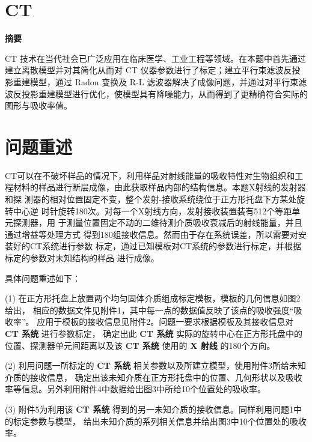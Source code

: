 \documentclass[12pt]{ctexart}
\begin{document}
	\section*{CT}
	
	\begin{center}
		\Large\textbf{摘要}
	\end{center}
	
	CT 技术在当代社会已广泛应用在临床医学、工业工程等领域。在本题中首先通过建立离散模型并对其简化从而对 CT 仪器参数进行了标定；建立平行束滤波反投影重建模型，通过 Radon 变换及 R-L 滤波器解决了成像问题，并通过对平行束滤波反投影重建模型进行优化，使模型具有降噪能力，从而得到了更精确符合实际的图形与吸收率值。
	
	
	
	\newpage
	
	\section{问题重述}
	
	CT可以在不破坏样品的情况下，利用样品对射线能量的吸收特性对生物组织和工
	程材料的样品进行断层成像，由此获取样品内部的结构信息。本题X射线的发射器和探
	测器的相对位置固定不变，整个发射-接收系统绕位于正方形托盘下方某处旋转中心逆
	时针旋转180次。对每一个X射线方向，发射接收装置装有512个等距单元探测器，用
	于测量位置固定不动的二维待测介质吸收衰减后的射线能量，并且通过增益等处理方式
	得到180组接收信息。然而由于存在系统误差，所以需要对安装好的CT系统进行参数
	标定，通过已知模板对CT系统的参数进行标定，并根据标定的参数对未知结构的样品
	进行成像。
	
	具体问题重述如下：
	
	\noindent
	(1) 在正方形托盘上放置两个均匀固体介质组成标定模板，模板的几何信息如图2给出，
	相应的数据文件见附件1，其中每一点的数据值反映了该点的吸收强度“吸收率”。
	应用于模板的接收信息见附件2。问题一要求根据模板及其接收信息对 \textbf{CT 系统} 进行参数标定，
	确定出此 \textbf{CT 系统} 实际的旋转中心在正方形托盘中的位置、探测器单元间距离以及该 \textbf{CT 系统} 使用的 \textbf{X 射线} 的180个方向。
	
	\noindent
	(2) 利用问题一所标定的 \textbf{CT 系统} 相关参数以及所建立模型，使用附件3所给未知介质的接收信息，
	确定出该未知介质在正方形托盘中的位置、几何形状以及吸收率等信息。另外利用附件4中数据给出图3中所给10个位置处的吸收率。
	
	\noindent
	(3) 附件5为利用该 \textbf{CT 系统} 得到的另一未知介质的接收信息。同样利用问题1中的标定参数与模型，
	给出未知介质的系列相关信息并给出图3中10个位置处的吸收率。
\end{document}
